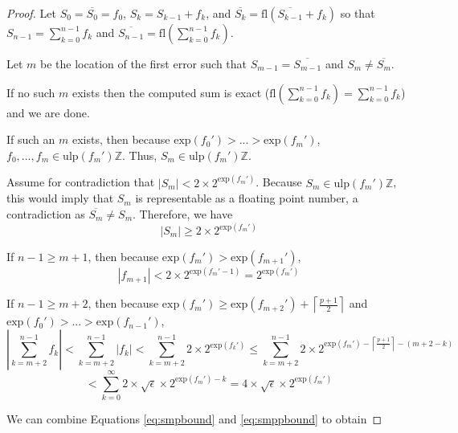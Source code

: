 \documentclass[12pt]{article}
\providecommand{\ceil}[1]{\left \lceil #1 \right \rceil }
\providecommand{\Z}{\ensuremath{\mathbb{Z}}}
\providecommand{\exp}{\ensuremath{\text{exp}}}
\providecommand{\ulp}{\ensuremath{\text{ulp}}}
\providecommand{\fl}{\ensuremath{\text{fl}}}
\theoremstyle{definition}
\numberwithin{equation}{section}
\begin{document}
    \begin{proof}
      Let $S_0 = \overline{S_0} = f_0$, $S_k = S_{k - 1} + f_k$, and $\overline{S_k} = \fl(\overline{S_{k - 1}} + f_k)$ so that $S_{n - 1} = \sum \limits_{k = 0}^{n - 1} f_k$ and $\overline{S_{n - 1}} = \fl(\sum \limits_{k = 0}^{n - 1} f_k)$.

      Let $m$ be the location of the first error such that $S_{m - 1} = \overline{S_{m - 1}}$ and $S_{m} \neq \overline{S_{m}}$.

      If no such $m$ exists then the computed sum is exact ($\fl(\sum \limits_{k = 0}^{n - 1} f_k) = \sum \limits_{k = 0}^{n - 1} f_k$) and we are done.

      If such an $m$ exists, then because $\exp(f_0') > ... > \exp(f_m')$, $f_0, ..., f_m \in \ulp(f_m')\Z$. Thus, $S_m \in \ulp(f_m')\Z$.

      Assume for contradiction that $|S_m| < 2 \times 2^{\exp(f_m')}$. Because $S_m \in \ulp(f_m')\Z$, this would imply that $S_m$ is representable as a floating point number, a contradiction as $\overline{S_m} \neq S_m$. Therefore, we have
      \begin{equation}
        |S_m| \geq 2 \times 2^{\exp(f_m')}
        \label{eq:smbound}
      \end{equation}

      If $n - 1 \geq m + 1$, then because $\exp(f_m') > \exp(f_{m + 1}')$,
      \begin{equation}
        |f_{m + 1}| < 2\times2^{\exp(f_m' - 1)} = 2^{\exp(f_m')}
        \label{eq:smpbound}
      \end{equation}

      If $n - 1 \geq m + 2$, then because $\exp(f_m') \geq \exp(f_{m + 2}') + \ceil{\frac{p + 1}{2}}$ and $\exp(f_0') > ... > \exp(f_{n - 1}')$,
      \begin{equation*}
        |\sum \limits_{k = m + 2}^{n - 1} f_k| < \sum \limits_{k = m + 2}^{n - 1} |f_k| < \sum \limits_{k = m + 2}^{n - 1} 2 \times 2^{\exp(f_k')} \leq \sum \limits_{k = m + 2}^{n - 1} 2 \times 2^{\exp(f_m') - \ceil{\frac{p + 1}{2}} - (m + 2 - k)}
      \end{equation*}
      \begin{equation}
        < \sum \limits_{k = 0}^{\infty} 2 \times \sqrt{\epsilon} \times 2^{\exp(f_m') - k} = 4 \times \sqrt\epsilon \times 2^{\exp(f_m')}
        \label{eq:smppbound}
      \end{equation}

      We can combine Equations \ref{eq:smpbound} and \ref{eq:smppbound} to obtain


\end{proof}
\end{document}
